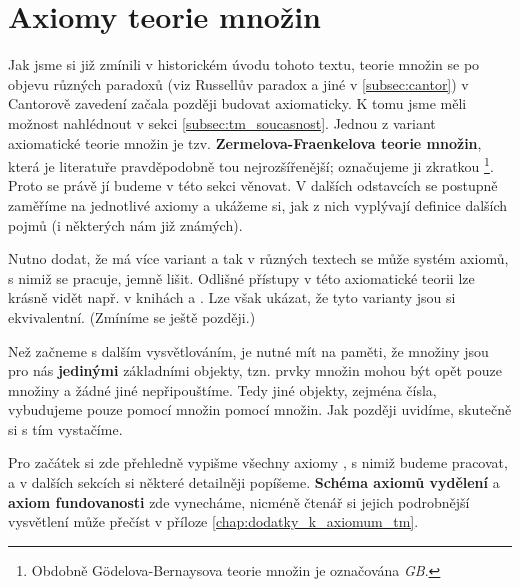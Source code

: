 \chapter{Axiomy teorie množin}\label{chap:axiomy_tm}
Jak jsme si již zmínili v historickém úvodu tohoto textu, teorie množin se po objevu různých paradoxů (viz Russellův paradox a jiné v \ref{subsec:cantor}) v Cantorově zavedení začala později budovat axiomaticky. K tomu jsme měli možnost nahlédnout v sekci \ref{subsec:tm_soucasnost}. Jednou z variant axiomatické teorie množin je tzv. \textbf{Zermelova-Fraenkelova teorie množin}, která je literatuře pravděpodobně tou nejrozšířenější; označujeme ji zkratkou \emph{\ZF}\footnote{Obdobně Gödelova-Bernaysova teorie množin je označována \emph{\textsf{GB}}.}. Proto se právě jí budeme v této sekci věnovat. V dalších odstavcích se postupně zaměříme na jednotlivé axiomy \ZF a ukážeme si, jak z nich vyplývají definice dalších pojmů (i některých nám již známých).\par
Nutno dodat, že \ZF má více variant a tak v různých textech se může systém axiomů, s nimiž se pracuje, jemně lišit. Odlišné přístupy v této axiomatické teorii lze krásně vidět např. v knihách \cite{BalcarStepanek1986} a \cite{Goldrei2017}. Lze však ukázat, že tyto varianty jsou si ekvivalentní. (Zmíníme se ještě později.)\par
Než začneme s dalším vysvětlováním, je nutné mít na paměti, že množiny jsou pro nás \textbf{jedinými} základními objekty, tzn. prvky množin mohou být opět pouze množiny a žádné jiné nepřipouštíme. Tedy jiné objekty, zejména čísla, vybudujeme pouze pomocí množin pomocí množin. Jak později uvidíme, skutečně si s tím vystačíme.\par
Pro začátek si zde přehledně vypišme všechny axiomy \ZF, s nimiž budeme pracovat, a v dalších sekcích si některé detailněji popíšeme. \textbf{Schéma axiomů vydělení} a \textbf{axiom fundovanosti} zde vynecháme, nicméně čtenář si jejich podrobnější vysvětlení může přečíst v příloze \ref{chap:dodatky_k_axiomum_tm}.
\medskip

